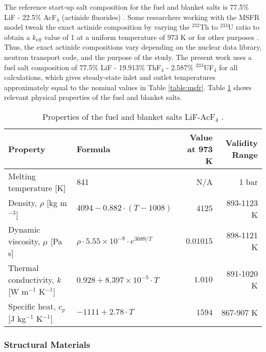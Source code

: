 The reference start-up salt composition for the fuel and blanket salts is
77.5\% LiF - 22.5\% AcF$_4$ (actinide fluorides)
\cite{merle-lucotte_launching_2011}. Some researchers working with the
\gls{MSFR} model tweak the exact actinide composition by varying the
$^{232}$Th to $^{233}$U ratio to obtain a $k_{\text{eff}}$ value of 1 at a
uniform temperature of 973 K \cite{brovchenko_neutronic_2019} or for other
purposes \cite{fiorina_molten_2013, pettersen_coupled_2016}. Thus,
the exact actinide compositions vary depending on the nuclear data library,
neutron transport code, and the purpose of the study. The present work uses
a fuel salt composition of 77.5\% LiF - 19.913\% ThF$_4$ - 2.587\%
$^{233}$UF$_4$ for all calculations, which gives steady-state inlet and outlet
temperatures approximately equal to the nominal values in Table
\ref{table:msfr}. Table \ref{table:prip} shows relevant physical properties of
the fuel and blanket salts.
%
\begin{table}[htb!]
\small
\centering
\caption{Properties of the fuel and blanket salts LiF-AcF$_4$
\cite{brovchenko_neutronic_2019}.}
\begin{tabular}{l l r r}
\toprule
Property & Formula & {Value at 973 K} & Validity Range\\
\midrule
Melting temperature [K] & 841 & {N/A} & 1 bar \\
Density, $\rho$ [kg m$^{-3}$] & $4094-0.882 \cdot (T-1008)$ & $4125$ & 893-1123 K \\
Dynamic viscosity, $\mu$ [Pa s] & $\rho \cdot 5.55 \times 10^{-8} \cdot e^{3689/T}$ & $0.01015$ & 898-1121 K \\
Thermal conductivity, $k$ [W m$^{-1}$ K$^{-1}$] & $0.928+8.397 \times 10^{-5} \cdot T$ & $1.010$ & 891-1020 K \\
Specific heat, $c_p$ [J kg$^{-1}$ K$^{-1}$] & $-1111+2.78\cdot T$ & $1594$ & 867-907 K \\
\bottomrule
\end{tabular}
\label{table:prip}
\end{table}

\subsubsection{Structural Materials}

